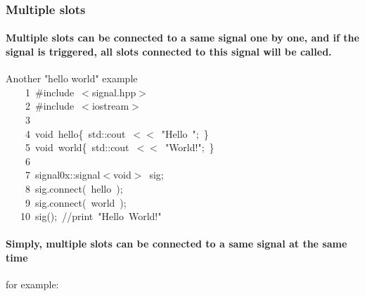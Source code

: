 \documentclass[9pt,onside,a4paper]{article}
\newcommand{\hlstd}[1]{\textcolor[rgb]{0.2,0,0.4}{#1}}
\newcommand{\hlstr}[1]{\textcolor[rgb]{0.09,0.38,0.65}{#1}}
\newcommand{\hlslc}[1]{\textcolor[rgb]{0,0.4,0.2}{#1}}
\newcommand{\hlppc}[1]{\textcolor[rgb]{0.33,0.45,0.69}{#1}}
\newcommand{\hlopt}[1]{\textcolor[rgb]{0.33,0.33,0.33}{#1}}
\newcommand{\hllin}[1]{\textcolor[rgb]{0.6,0.6,0.6}{#1}}
\newcommand{\hlkwb}[1]{\textcolor[rgb]{0.96,0.55,0.14}{#1}}
\newcommand{\hlkwd}[1]{\textcolor[rgb]{0.82,0.11,0.93}{#1}}
\begin{document}
\subsubsection{Multiple slots}

\paragraph{Multiple slots can be connected to a same signal one by one, and if the signal is triggered, all slots connected to this signal will be called.  \\}
Another "hello world" example \\

\noindent
\ttfamily
\hlstd{}\hllin{\ \ \ \ 1\ }\hlppc{\#include\ $<$signal.hpp$>$}\\
\hllin{\ \ \ \ 2\ }\hlstd{}\hlppc{\#include\ $<$iostream$>$}\\
\hllin{\ \ \ \ 3\ }\hlstd{}\\
\hllin{\ \ \ \ 4\ }\hlkwb{void\ }\hlstd{hello}\hlopt{\{\ }\hlstd{std}\hlopt{::}\hlstd{cout\ }\hlopt{$<$$<$\ }\hlstd{}\hlstr{"Hello\ "}\hlstd{}\hlopt{;\ \}}\\
\hllin{\ \ \ \ 5\ }\hlstd{}\hlkwb{void\ }\hlstd{world}\hlopt{\{\ }\hlstd{std}\hlopt{::}\hlstd{cout\ }\hlopt{$<$$<$\ }\hlstd{}\hlstr{"World!"}\hlstd{}\hlopt{;\ \}}\\
\hllin{\ \ \ \ 6\ }\hlstd{\\
\hllin{\ \ \ \ 7\ }signal0x}\hlopt{::}\hlstd{signal}\hlopt{$<$}\hlstd{}\hlkwb{void}\hlstd{}\hlopt{$>$\ }\hlstd{sig}\hlopt{;}\\
\hllin{\ \ \ \ 8\ }\hlstd{sig}\hlopt{.}\hlstd{}\hlkwd{connect}\hlstd{}\hlopt{(\ }\hlstd{hello\ }\hlopt{);}\\
\hllin{\ \ \ \ 9\ }\hlstd{sig}\hlopt{.}\hlstd{}\hlkwd{connect}\hlstd{}\hlopt{(\ }\hlstd{world\ }\hlopt{);}\\
\hllin{\ \ \ 10\ }\hlstd{}\hlkwd{sig}\hlstd{}\hlopt{();\ }\hlstd{}\hlslc{//print\ "Hello\ World!"}\hlstd{}\\
\mbox{}
\normalfont
\normalsize

\paragraph{Simply, multiple slots can be connected to a same signal at the same time\\}
for example: \\
\end{document}
